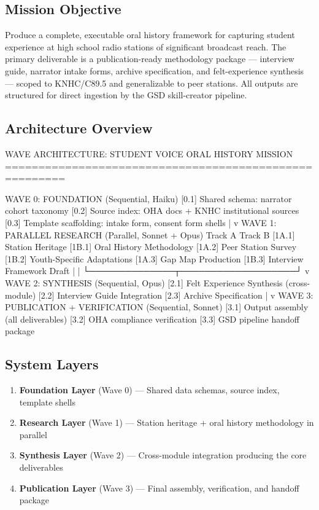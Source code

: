 \documentclass[11pt,letterpaper]{article}
\begin{document}
\subsection{Mission Objective}

Produce a complete, executable oral history framework for capturing student experience at high school radio stations of significant broadcast reach. The primary deliverable is a publication-ready methodology package --- interview guide, narrator intake forms, archive specification, and felt-experience synthesis --- scoped to KNHC/C89.5 and generalizable to peer stations. All outputs are structured for direct ingestion by the GSD skill-creator pipeline.

\subsection{Architecture Overview}

\begin{asciibox}
WAVE ARCHITECTURE: STUDENT VOICE ORAL HISTORY MISSION
=======================================================

WAVE 0: FOUNDATION (Sequential, Haiku)
  [0.1] Shared schema: narrator cohort taxonomy
  [0.2] Source index: OHA docs + KNHC institutional sources
  [0.3] Template scaffolding: intake form, consent form shells
        |
        v
WAVE 1: PARALLEL RESEARCH (Parallel, Sonnet + Opus)
  Track A                          Track B
  [1A.1] Station Heritage          [1B.1] Oral History Methodology
  [1A.2] Peer Station Survey       [1B.2] Youth-Specific Adaptations
  [1A.3] Gap Map Production        [1B.3] Interview Framework Draft
        |                                  |
        └──────────────┬───────────────────┘
                       v
WAVE 2: SYNTHESIS (Sequential, Opus)
  [2.1] Felt Experience Synthesis (cross-module)
  [2.2] Interview Guide Integration
  [2.3] Archive Specification
        |
        v
WAVE 3: PUBLICATION + VERIFICATION (Sequential, Sonnet)
  [3.1] Output assembly (all deliverables)
  [3.2] OHA compliance verification
  [3.3] GSD pipeline handoff package
\end{asciibox}

\subsection{System Layers}

\begin{enumerate}
  \item \textbf{Foundation Layer} (Wave 0) --- Shared data schemas, source index, template shells
  \item \textbf{Research Layer} (Wave 1) --- Station heritage + oral history methodology in parallel
  \item \textbf{Synthesis Layer} (Wave 2) --- Cross-module integration producing the core deliverables
  \item \textbf{Publication Layer} (Wave 3) --- Final assembly, verification, and handoff package
\end{enumerate}
\end{document}
